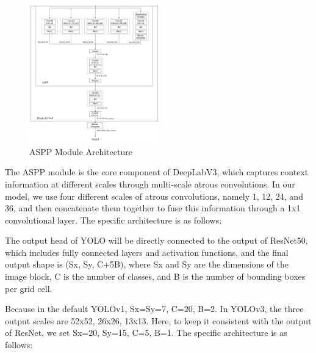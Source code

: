 \documentclass[conference]{IEEEtran}
\begin{document}
\begin{figure}[htbp]
    \centering
    \centerline{\includegraphics[width=0.5\textwidth]{fig/aspp.png}}
    \caption{ASPP Module Architecture}
    \label{fig:aspp}
\end{figure}


The ASPP module is the core component of DeepLabV3, which captures context information at different scales through multi-scale atrous convolutions. In our model, we use four different scales of atrous convolutions, namely 1, 12, 24, and 36, and then concatenate them together to fuse this information through a 1x1 convolutional layer. The specific architecture is as follows:


The output head of YOLO will be directly connected to the output of ResNet50, which includes fully connected layers and activation functions, and the final output shape is (Sx, Sy, C+5B), where Sx and Sy are the dimensions of the image block, C is the number of classes, and B is the number of bounding boxes per grid cell. 


Because in the default YOLOv1, Sx=Sy=7, C=20, B=2. In YOLOv3, the three output scales are 52x52, 26x26, 13x13. Here, to keep it consistent with the output of ResNet, we set Sx=20, Sy=15, C=5, B=1. The specific architecture is as follows:
\end{document}
